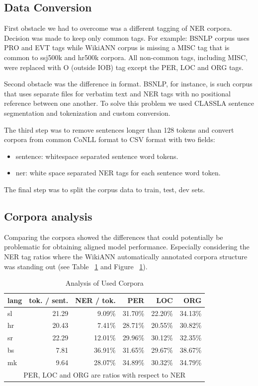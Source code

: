 \documentclass[sigconf]{acmart}
\begin{document}
\subsection{Data Conversion}
First obstacle we had to overcome was a different tagging of NER corpora.
Decision was made to keep only common tags.
For example: BSNLP corpus uses PRO and EVT tags while WikiANN corpus is missing a MISC tag that is common to ssj500k and hr500k corpora.
All non-common tags, including MISC, were replaced with O (outside IOB) tag except the PER, LOC and ORG tags.

Second obstacle was the difference in format.
BSNLP, for instance, is such corpus that uses separate files for verbatim text and NER tags with no positional reference between one another.
To solve this problem we used CLASSLA\cite{ljubesic-dobrovoljc-2019-neural} sentence segmentation and tokenization and custom conversion.

The third step was to remove sentences longer than 128 tokens and convert corpora from common CoNLL format to CSV format with two fields:
\begin{itemize}
  \item sentence: whitespace separated sentence word tokens.
  \item ner: white space separated NER tags for each sentence word token.
\end{itemize}

The final step was to split the corpus data to train, test, dev sets.

\subsection{Corpora analysis}
Comparing the corpora showed the differences that could potentially be problematic for obtaining aligned model performance.
Especially considering the NER tag ratios where the WikiANN automatically annotated corpora structure was standing out (see Table ~\ref{tab:corpora_analysis} and Figure ~\ref{tab:corpora_analysis}).
\begin{table}[H]
  \caption{Analysis of Used Corpora}
  \label{tab:corpora_analysis}
  \begin{tabular}{lrrrrr}
    \toprule
    lang&tok. / sent.&NER / tok.&PER&LOC&ORG\\
    \midrule
    sl&21.29&9.09\%&31.70\%&22.20\%&34.13\%\\
    hr&20.43&7.41\%&28.71\%&20.55\%&30.82\%\\
    sr&22.29&12.01\%&29.96\%&30.12\%&32.35\%\\
    bs&7.81&36.91\%&31.65\%&29.67\%&38.67\%\\
    mk&9.64&28.07\%&34.89\%&30.32\%&34.79\%\\
    \bottomrule
    \multicolumn{6}{c}{PER, LOC and ORG are ratios with respect to NER}
  \end{tabular}
\end{table}
\end{document}
